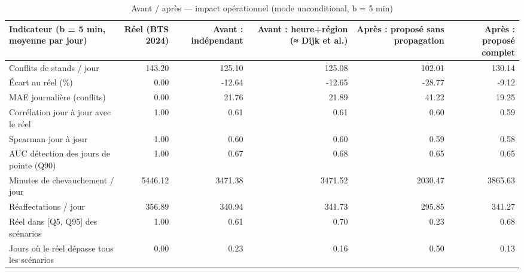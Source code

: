 \begin{table}
\caption{Avant / après — impact opérationnel (mode unconditional, b = 5 min)}
\label{tab:T3b_unconditional}
\begin{tabular}{lrrrrr}
\toprule
Indicateur (b = 5 min, moyenne par jour) & Réel (BTS 2024) & Avant : indépendant & Avant : heure+région (≈ Dijk et al.) & Après : proposé sans propagation & Après : proposé complet \\
\midrule
Conflits de stands / jour & 143.20 & 125.10 & 125.08 & 102.01 & 130.14 \\
Écart au réel (\%) & 0.00 & -12.64 & -12.65 & -28.77 & -9.12 \\
MAE journalière (conflits) & 0.00 & 21.76 & 21.89 & 41.22 & 19.25 \\
Corrélation jour à jour avec le réel & 1.00 & 0.61 & 0.61 & 0.60 & 0.59 \\
Spearman jour à jour & 1.00 & 0.60 & 0.60 & 0.59 & 0.58 \\
AUC détection des jours de pointe (Q90) & 1.00 & 0.67 & 0.68 & 0.65 & 0.65 \\
Minutes de chevauchement / jour & 5446.12 & 3471.38 & 3471.52 & 2030.47 & 3865.63 \\
Réaffectations / jour & 356.89 & 340.94 & 341.73 & 295.85 & 341.27 \\
Réel dans [Q5, Q95] des scénarios & 1.00 & 0.61 & 0.70 & 0.23 & 0.68 \\
Jours où le réel dépasse tous les scénarios & 0.00 & 0.23 & 0.16 & 0.50 & 0.13 \\
\bottomrule
\end{tabular}
\end{table}
